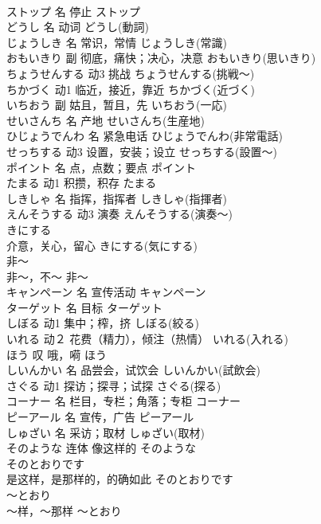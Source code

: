 \documentclass[8pt]{extreport}
\begin{document}
\begin{CJK}{UTF8}{min}
\\	ストップ	名	停止	ストップ	
\\	どうし	名	动词	どうし(動詞)	
\\	じょうしき	名	常识，常情	じょうしき(常識)	
\\	おもいきり	副	彻底，痛快；决心，决意	おもいきり(思いきり)	
\\	ちょうせんする	动3	挑战	ちょうせんする(挑戦～)	
\\	ちかづく	动1	临近，接近，靠近	ちかづく(近づく)	
\\	いちおう	副	姑且，暂且，先	いちおう(一応)	
\\	せいさんち	名	产地	せいさんち(生産地)	
\\	ひじょうでんわ	名	紧急电话	ひじょうでんわ(非常電話)	
\\	せっちする	动3	设置，安装；设立	せっちする(設置～)	
\\	ポイント	名	点，点数；要点	ポイント	
\\	たまる	动1	积攒，积存	たまる	
\\	しきしゃ	名	指挥，指挥者	しきしゃ(指揮者)	
\\	えんそうする	动3	演奏	えんそうする(演奏～)	
\\	きにする	
\\	介意，关心，留心	きにする(気にする)	
\\	非～	
\\	非～，不～	非～	
\\	キャンペーン	名	宣传活动	キャンペーン	
\\	ターゲット	名	目标	ターゲット	
\\	しぼる	动1	集中；榨，挤	しぼる(絞る)	
\\	いれる	动２	花费（精力），倾注（热情）	いれる(入れる)	
\\	ほう	叹	哦，嗬	ほう	
\\	しいんかい	名	品尝会，试饮会	しいんかい(試飲会)	
\\	さぐる	动1	探访；探寻；试探	さぐる(探る)	
\\	コーナー	名	栏目，专栏；角落；专柜	コーナー	
\\	ピーアール	名	宣传，广告	ピーアール
\\	しゅざい	名	采访；取材	しゅざい(取材)	
\\	そのような	连体	像这样的	そのような	
\\	そのとおりです	
\\	是这样，是那样的，的确如此	そのとおりです	
\\	～とおり	
\\	～样，～那样	～とおり	

\end{CJK}
\end{document}
